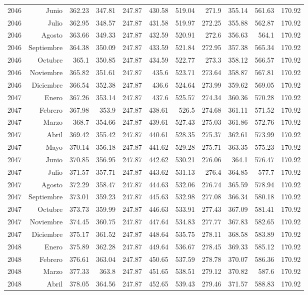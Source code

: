 \documentclass{article}%
\begin{document}
\begin{longtable}{|l r|r|r|r|r|r|r|r|r|r|}
2046&Junio&362.23&347.81&247.87&430.58&519.04&271.9&355.14&561.63&170.92\\%
2046&Julio&362.95&348.57&247.87&431.58&519.97&272.25&355.88&562.87&170.92\\%
2046&Agosto&363.66&349.33&247.87&432.59&520.91&272.6&356.63&564.1&170.92\\%
2046&Septiembre&364.38&350.09&247.87&433.59&521.84&272.95&357.38&565.34&170.92\\%
2046&Octubre&365.1&350.85&247.87&434.59&522.77&273.3&358.12&566.57&170.92\\%
2046&Noviembre&365.82&351.61&247.87&435.6&523.71&273.64&358.87&567.81&170.92\\%
2046&Diciembre&366.54&352.38&247.87&436.6&524.64&273.99&359.62&569.05&170.92\\%
2047&Enero&367.26&353.14&247.87&437.6&525.57&274.34&360.36&570.28&170.92\\%
2047&Febrero&367.98&353.9&247.87&438.61&526.5&274.68&361.11&571.52&170.92\\%
2047&Marzo&368.7&354.66&247.87&439.61&527.43&275.03&361.86&572.76&170.92\\%
2047&Abril&369.42&355.42&247.87&440.61&528.35&275.37&362.61&573.99&170.92\\%
2047&Mayo&370.14&356.18&247.87&441.62&529.28&275.71&363.35&575.23&170.92\\%
2047&Junio&370.85&356.95&247.87&442.62&530.21&276.06&364.1&576.47&170.92\\%
2047&Julio&371.57&357.71&247.87&443.62&531.13&276.4&364.85&577.7&170.92\\%
2047&Agosto&372.29&358.47&247.87&444.63&532.06&276.74&365.59&578.94&170.92\\%
2047&Septiembre&373.01&359.23&247.87&445.63&532.98&277.08&366.34&580.18&170.92\\%
2047&Octubre&373.73&359.99&247.87&446.63&533.91&277.43&367.09&581.41&170.92\\%
2047&Noviembre&374.45&360.75&247.87&447.64&534.83&277.77&367.83&582.65&170.92\\%
2047&Diciembre&375.17&361.52&247.87&448.64&535.75&278.11&368.58&583.89&170.92\\%
2048&Enero&375.89&362.28&247.87&449.64&536.67&278.45&369.33&585.12&170.92\\%
2048&Febrero&376.61&363.04&247.87&450.65&537.59&278.78&370.07&586.36&170.92\\%
2048&Marzo&377.33&363.8&247.87&451.65&538.51&279.12&370.82&587.6&170.92\\%
2048&Abril&378.05&364.56&247.87&452.65&539.43&279.46&371.57&588.83&170.92\\%

\end{longtable}
\end{document}
